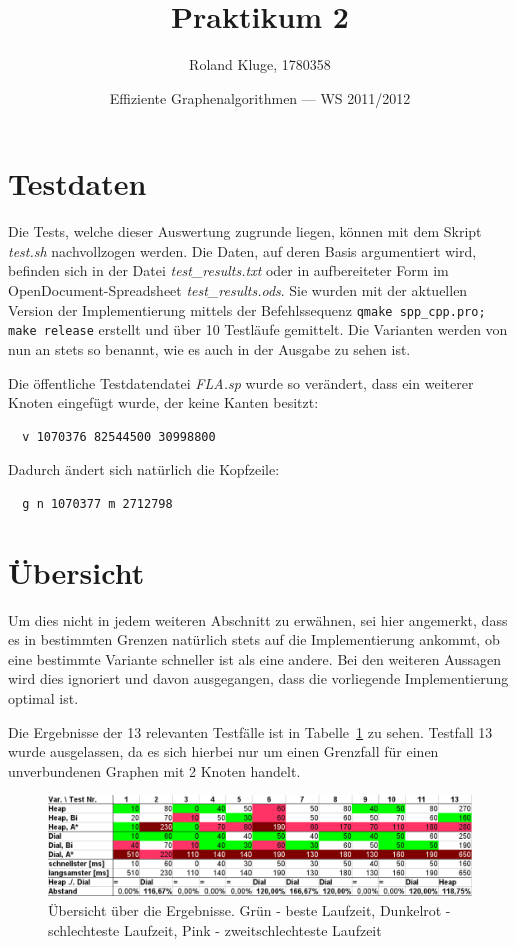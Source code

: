 \documentclass{scrartcl}
\title{Praktikum 2}
\date{Effiziente Graphenalgorithmen --- WS 2011/2012}
\author{Roland Kluge, 1780358}
\begin{document}
\maketitle

\section{Testdaten}

Die Tests, welche dieser Auswertung zugrunde liegen, können mit dem Skript
\emph{test.sh} nachvollzogen werden.
Die Daten, auf deren Basis argumentiert wird, befinden sich in der Datei
\emph{test\_results.txt} oder in aufbereiteter Form im 
OpenDocument-Spreadsheet \emph{test\_results.ods}.
Sie wurden mit der aktuellen Version der Implementierung mittels der Befehlssequenz
\texttt{qmake spp\_cpp.pro; make release} erstellt und über
10 Testläufe gemittelt.
Die Varianten werden von nun an stets so benannt, wie es auch in der Ausgabe
zu sehen ist.

Die öffentliche Testdatendatei \emph{FLA.sp} wurde so verändert, dass ein
weiterer Knoten eingefügt wurde, der keine Kanten besitzt:
\begin{verbatim}
  v 1070376 82544500 30998800
\end{verbatim}
Dadurch ändert sich natürlich die Kopfzeile:
\begin{verbatim}
  g n 1070377 m 2712798
\end{verbatim}


\section{Übersicht}

Um dies nicht in jedem weiteren Abschnitt zu erwähnen, sei hier angemerkt,
dass es in bestimmten Grenzen natürlich stets auf die Implementierung ankommt, 
ob eine bestimmte Variante schneller ist als eine andere.
Bei den weiteren Aussagen wird dies ignoriert und davon ausgegangen, dass die
vorliegende Implementierung optimal ist.

Die Ergebnisse der 13 relevanten Testfälle ist in Tabelle~\ref{ref:results}
zu sehen. Testfall 13 wurde ausgelassen, da es sich hierbei nur um einen
Grenzfall für einen unverbundenen Graphen mit 2 Knoten handelt.

\begin{figure}[htbp]
\includegraphics[width=\textwidth]{test_results.png}
\caption{Übersicht über die Ergebnisse. Grün - beste Laufzeit, Dunkelrot - schlechteste Laufzeit, Pink - zweitschlechteste Laufzeit}
\label{ref:results}
\end{figure}
\end{document}
